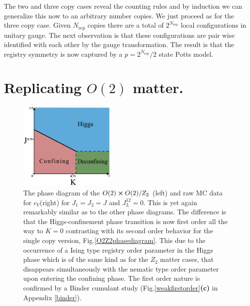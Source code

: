 The two and three copy cases reveal the counting rules and by induction we can generalize this now to an arbitrary number copies. We just proceed as for the three copy case. Given $N_{\text{rep}}$ copies there are a total of $2^{N_{\text{rep}}}$ local configurations in unitary gauge. The next observation is that these configurations are pair wise identified with each other by the gauge transformation. The result is that the registry symmetry is now captured by a $p = 2^{N_{\text{rep}}} /2 $ state Potts model. 

\section{Replicating $O(2)$ matter.}
\label{replO2}

\begin{figure}[!h]
	\centering	\includegraphics[width=0.425\textwidth]{figures/chapter2/O2xO2Z2phasedia.pdf}
	\caption{The phase diagram of the $O(2) \cross O(2) / Z_2$ (left) and raw MC data for $c_V$(right) for $J_1 = J_2 = J$ and $J_L^{12} =0$. This is yet again remarkably similar as to the other phase diagrams. The difference is that the Higgs-confinement phase transition is now first order all the way to $K=0$ contrasting with its second order behavior for the single copy version, Fig.\ref{O2Z2phasediagram}. This due to the occurrence of a Ising type registry order parameter in the Higgs phase which is of the same kind as for the $Z_2$ matter cases, that disappears simultaneously with the nematic type order parameter upon entering the confining phase. The first order nature is confirmed by a Binder cumulant study (Fig.\ref{weakfirstorder}{\textbf{(c)}} in Appendix \ref{binder}).}
	\label{O2xO2Z2phasediagram}
\end{figure}



